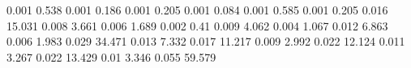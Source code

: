 0.001      0.538      %
0.001      0.186      %
0.001      0.205      %
0.001      0.084      %
0.001      0.585      %
0.001      0.205      %
0.016      15.031     %
0.008      3.661      %
0.006      1.689      %
0.002      0.41       %
0.009      4.062      %
0.004      1.067      %
0.012      6.863      %
0.006      1.983      %
0.029      34.471     %
0.013      7.332      %
0.017      11.217     %
0.009      2.992      %
0.022      12.124     %
0.011      3.267      %
0.022      13.429     %
0.01       3.346      %
0.055      59.579     %
